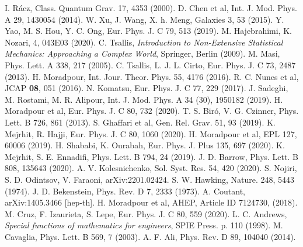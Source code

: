 \documentclass[twocolumn,preprintnumbers,amsmath,nofootinbib,amssymb]{revtex4}
\begin{document}
\begin{thebibliography}{10}
 I. R\'{a}cz, Class. Quantum Grav. 17, 4353 (2000).
 D. Chen et al, Int. J. Mod. Phys. A 29, 1430054 (2014).
 W. Xu, J. Wang, X. h. Meng, Galaxies 3, 53 (2015).
 Y. Yao, M. S. Hou, Y. C. Ong, Eur. Phys. J. C 79, 513 (2019).
 M. Hajebrahimi, K. Nozari, 4, 043E03 (2020).
 C. Tsallis, \textit{Introduction to Non-Extensive Statistical Mechanics: Approaching a Complex World},
Springer, Berlin (2009).
 M. Masi, Phys. Lett. A 338, 217 (2005).
 C. Tsallis, L. J. L. Cirto, Eur. Phys. J. C 73, 2487 (2013).
 H. Moradpour, Int. Jour. Theor. Phys. 55, 4176 (2016).
 R. C. Nunes et al, JCAP \textbf{08}, 051 (2016).
 N. Komatsu, Eur. Phys. J. C 77, 229 (2017).
 J. Sadeghi, M. Rostami, M. R. Alipour, Int. J. Mod. Phys. A 34 (30), 1950182 (2019).
 H. Moradpour et al, Eur. Phys. J. C 80, 732 (2020).
 T. S. Bir\'{o}, V. G. Czinner, Phys. Lett. B 726, 861 (2013).
 S. Ghaffari et al, Gen. Rel. Grav. 51, 93 (2019).
 K. Mejrhit, R. Hajji, Eur. Phys. J. C 80, 1060 (2020).
 H. Moradpour et al, EPL 127, 60006 (2019).
 H. Shababi, K. Ourabah, Eur. Phys. J. Plus 135, 697 (2020).
 K. Mejrhit, S. E. Ennadifi, Phys. Lett. B 794, 24 (2019).
 J. D. Barrow, Phys. Lett. B 808, 135643 (2020).
 A. V. Kolesnichenko, Sol. Syst. Res. 54, 420 (2020).
 S. Nojiri, S. D. Odintsov, V. Faraoni, arXiv:2201.02424.
 S. W. Hawking, Nature. 248, 5443 (1974).
 J. D. Bekenstein, Phys. Rev. D 7, 2333 (1973).
 A. Coutant, arXiv:1405.3466 [hep-th].
 H. Moradpour et al, AHEP, Article ID 7124730, (2018).
 M. Cruz, F. Izaurieta, S. Lepe, Eur. Phys. J. C 80, 559 (2020).
 L. C. Andrews, \textit{Special functions of mathematics for engineers}, SPIE Press. p. 110 (1998).
 M. Cavaglia, Phys. Lett. B 569, 7 (2003).
 A. F. Ali, Phys. Rev. D 89, 104040 (2014).

\end{thebibliography}
\end{document}
